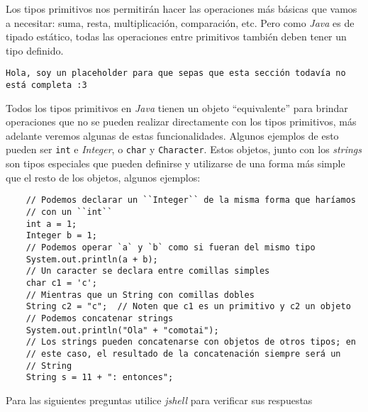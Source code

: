   Los tipos primitivos nos permitirán hacer las operaciones más básicas que vamos a necesitar: suma,
  resta, multiplicación, comparación, etc.
  Pero como \textit{Java} es de tipado estático, todas las operaciones entre primitivos también
  deben tener un tipo definido.
  
  \begin{center}
    \texttt{Hola, soy un placeholder para que sepas que esta sección todavía no está completa :3}
  \end{center}

  Todos los tipos primitivos en \textit{Java} tienen un objeto \enquote{equivalente} 
  para brindar operaciones que no se pueden realizar directamente con los tipos 
  primitivos, más adelante veremos algunas de estas funcionalidades.
  Algunos ejemplos de esto pueden ser \texttt{int} e \textit{Integer}, o 
  \texttt{char} y \texttt{Character}.
  Estos objetos, junto con los \textit{strings} son tipos especiales que pueden definirse y 
  utilizarse de una forma más simple que el resto de los objetos, algunos ejemplos:
  
  \begin{verbatim}
    // Podemos declarar un ``Integer`` de la misma forma que haríamos
    // con un ``int``
    int a = 1;
    Integer b = 1;
    // Podemos operar `a` y `b` como si fueran del mismo tipo
    System.out.println(a + b);
    // Un caracter se declara entre comillas simples
    char c1 = 'c';
    // Mientras que un String con comillas dobles
    String c2 = "c";  // Noten que c1 es un primitivo y c2 un objeto
    // Podemos concatenar strings
    System.out.println("Ola" + "comotai");
    // Los strings pueden concatenarse con objetos de otros tipos; en
    // este caso, el resultado de la concatenación siempre será un 
    // String
    String s = 11 + ": entonces";
  \end{verbatim}

  \begin{exercise}
    Para las siguientes preguntas utilice \textit{jshell} para verificar sus respuestas
  \end{exercise}
